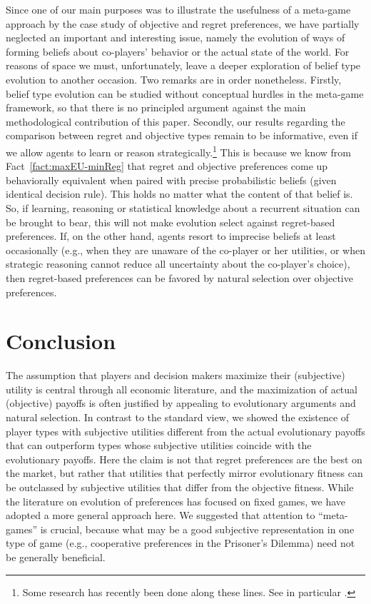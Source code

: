 \documentclass[fleqn,reqno,12pt]{article}
\theoremstyle{Satz}
\theoremstyle{Bsp}
\begin{document}
Since one of our main purposes was to illustrate the usefulness of a meta-game approach
by the case study of objective and regret preferences, we have partially neglected an 
important and interesting issue, namely the evolution of ways of forming beliefs
about co-players' behavior or the actual state of the world. For reasons of space we must,
unfortunately, leave a deeper exploration of belief type evolution to another occasion. Two
remarks are in order nonetheless. Firstly, belief type evolution can be studied without
conceptual hurdles in the meta-game framework, so that there is no principled argument
against the main methodological contribution of this paper. Secondly, our results regarding the
comparison between regret and objective types remain to be informative, even if we
allow agents to learn or reason strategically.\footnote{Some research has recently been done along these lines. See in particular \cite{RobalinoRobson16,Mengel12,Mohlin12}.} This is because we know from
Fact~\ref{fact:maxEU-minReg} that regret and objective preferences come up behaviorally
equivalent when paired with precise probabilistic beliefs (given identical decision rule). This
holds no matter what the content of that belief is. So, if learning, reasoning or statistical
knowledge about a recurrent situation can be brought to bear, this will not make evolution
select against regret-based preferences. If, on the other hand, agents resort to imprecise
beliefs at least occasionally (e.g., when they are unaware of the co-player or her utilities,
or when strategic reasoning cannot reduce all uncertainty about the co-player's choice), then regret-based preferences
can be favored by natural selection over objective preferences.

\section{Conclusion} \label{sec:conclusion}


The assumption that players and decision makers maximize their (subjective) utility is
central through all economic literature, and the maximization of actual (objective) payoffs is
often justified by appealing to evolutionary arguments and natural selection. In contrast to
the standard view, we showed the existence of player types with subjective utilities different
from the actual evolutionary payoffs that can outperform types whose subjective utilities
coincide with the evolutionary payoffs. Here the claim is not that regret preferences are the best on the market, but rather that utilities that perfectly mirror evolutionary fitness can be outclassed by subjective utilities that differ from the objective fitness.  While the literature on evolution of preferences has
focused on fixed games, we have adopted a more general approach here. We suggested that
attention to “meta-games” is crucial, because what may be a good subjective representation in
one type of game (e.g., cooperative preferences in the Prisoner’s Dilemma) need not be
generally beneficial. 
\end{document}
